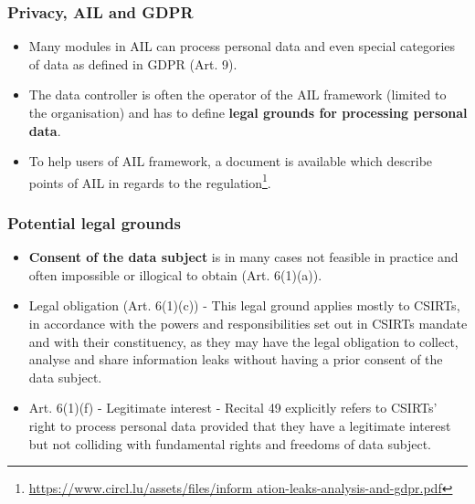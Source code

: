 \documentclass{beamer}
\begin{document}
\begin{frame}
        \frametitle{Privacy, AIL and GDPR}
        \begin{itemize}
                \item Many modules in AIL can process personal data and even special categories of data as defined in GDPR (Art. 9).
                \item The data controller is often the operator of the AIL framework (limited to the organisation) and has to define {\bf legal grounds for processing personal data}.
                \item To help users of AIL framework, a document is available which describe points of AIL in regards to the regulation\footnote{\url{https://www.circl.lu/assets/files/inform
ation-leaks-analysis-and-gdpr.pdf}}.
        \end{itemize}
\end{frame}

\begin{frame}
        \frametitle{Potential legal grounds}
        \begin{itemize}
                \item {\bf Consent of the data subject} is in many cases not feasible in practice and often impossible or illogical to obtain (Art. 6(1)(a)).
                \item Legal obligation (Art. 6(1)(c)) - This legal ground applies mostly to CSIRTs, in accordance with the powers and responsibilities set out in CSIRTs mandate and with their constituency, as they may have the legal obligation to collect, analyse and share information leaks without having a prior consent of the data subject.
				\item Art. 6(1)(f) - Legitimate interest - Recital 49 explicitly refers to CSIRTs’ right to process personal data provided that they have a legitimate interest but not colliding with fundamental rights and freedoms of data subject.
        \end{itemize}
\end{frame}



\end{document}
